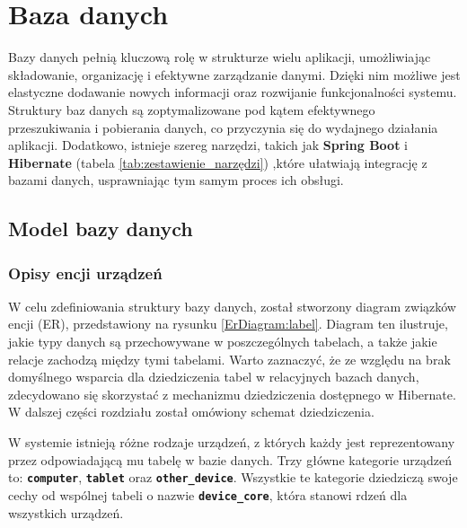 \chapter{Baza danych}



Bazy danych pełnią kluczową rolę w strukturze wielu aplikacji, umożliwiając składowanie, organizację i efektywne zarządzanie danymi. Dzięki nim możliwe jest elastyczne dodawanie nowych informacji oraz rozwijanie funkcjonalności systemu. Struktury baz danych są zoptymalizowane pod kątem efektywnego przeszukiwania i pobierania danych, co przyczynia się do wydajnego działania aplikacji. Dodatkowo, istnieje szereg narzędzi, takich jak \textbf{Spring Boot} i \textbf{Hibernate} (tabela \ref{tab:zestawienie_narzędzi})
,które ułatwiają integrację z bazami danych, usprawniając tym samym proces ich obsługi.

\section{Model bazy danych}

\subsection{Opisy encji urządzeń}
W celu zdefiniowania struktury bazy danych, został stworzony diagram związków encji (ER), przedstawiony na rysunku \ref{ErDiagram:label}. Diagram ten ilustruje, jakie typy danych są przechowywane w poszczególnych tabelach, a także jakie relacje zachodzą między tymi tabelami. Warto zaznaczyć, że ze względu na brak domyślnego wsparcia dla dziedziczenia tabel w relacyjnych bazach danych, zdecydowano się skorzystać z mechanizmu dziedziczenia dostępnego w Hibernate. W dalszej części rozdziału został omówiony schemat dziedziczenia.

W systemie istnieją różne rodzaje urządzeń, z których każdy jest reprezentowany przez odpowiadającą mu tabelę w bazie danych. Trzy główne kategorie urządzeń to: \texttt{\textbf{computer}}, \texttt{\textbf{tablet}} oraz \texttt{\textbf{other\_device}}. Wszystkie te kategorie dziedziczą swoje cechy od wspólnej tabeli o nazwie \texttt{\textbf{device\_core}}, która stanowi rdzeń dla wszystkich urządzeń.

